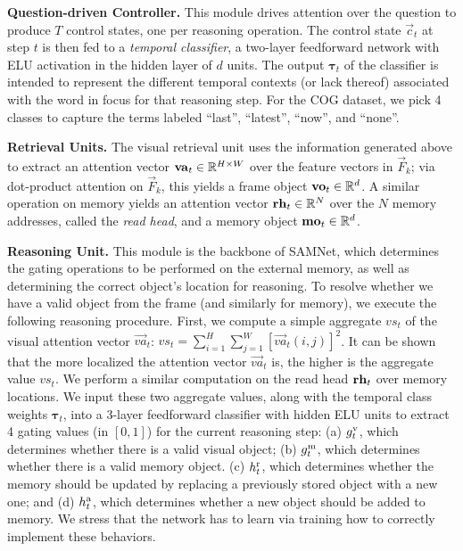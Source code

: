 \noindent\textbf{Question-driven Controller.}
This module drives attention over the question to produce $T$ control states, one per reasoning operation.
The control state $\vec{c}_t$ at step $t$ is then fed to a \emph{temporal classifier},
a two-layer feedforward network with ELU activation in the hidden layer of $d$ units.
The output $\bm{\tau}_t$ of the classifier is intended to represent the different temporal contexts (or lack thereof) associated with the word in focus for that reasoning step.
For the COG dataset, we pick 4 classes to capture the terms labeled ``last'', ``latest'', ``now'', and ``none''.

\smallskip

\noindent\textbf{Retrieval Units.} The visual retrieval unit uses the information generated above to extract an attention vector $\mathbf{va}_t \in \mathbb{R}^{H \times W}$ over the feature vectors in $\vec{F}_k$; via dot-product attention on $\vec{F}_k$, this yields  a frame object $\mathbf{vo}_t \in \mathbb{R}^d$.
A similar operation on memory yields an attention vector $\mathbf{rh}_t \in \mathbb{R}^N$ over the $N$ memory addresses, called the \emph{read head}, and a memory object
$\mathbf{mo}_t \in \mathbb{R}^d$.

\smallskip

\noindent\textbf{Reasoning Unit.}
This module is the backbone of SAMNet, which determines the gating operations to be performed on the external memory, as well as determining the correct object's location for reasoning.
To resolve whether we have a valid object from the frame (and similarly for memory), we execute the following reasoning procedure.
First, we compute a simple aggregate $vs_t$ %
of the visual attention vector $\vec{va}_t$:
$vs_t = \sum_{i=1}^H \sum_{j=1}^W [\vec{va}_t(i,j)]^2$. It can be shown that the more localized the attention
vector $\vec{va}_t$ is, the higher is the aggregate value $vs_t$.
We perform a similar computation on the read head $\mathbf{rh}_t$ over memory locations.
We input these two aggregate values, along with the temporal class weights $\bm{\tau}_t$, into a 3-layer feedforward classifier with hidden ELU units to extract 4 gating values (in $[0,1]$) for the current reasoning step:
(a) $g^{\mathrm{v}}_t$, which determines whether there is a valid visual object;
(b) $g^{\mathrm{m}}_t$, which determines whether there is a valid memory object.
(c) $h^{\mathrm{r}}_t$, which determines whether the memory should be updated by replacing a previously stored object with a new one; and
(d) $h^{\mathrm{a}}_t$, which determines whether a new object should be added to memory.
We stress that the network has to learn via training how to correctly implement these behaviors.

